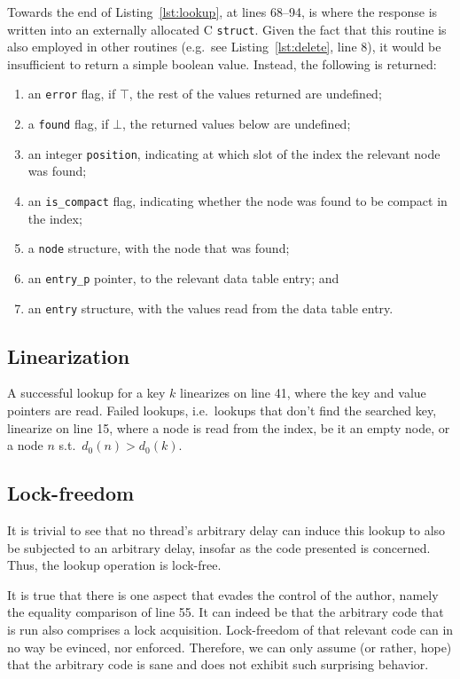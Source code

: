 Towards the end of Listing~\ref{lst:lookup}, at lines 68--94, is where the response is written into an externally allocated C \texttt{struct}.
Given the fact that this routine is also employed in other routines (e.g.\ see Listing~\ref{lst:delete}, line 8), it would be insufficient to return a simple boolean value.
Instead, the following is returned:
\begin{enumerate}
    \item an \texttt{error} flag, if $\top$, the rest of the values returned are undefined;
    \item a \texttt{found} flag, if $\bot$, the returned values below are undefined;
    \item an integer \texttt{position}, indicating at which slot of the index the relevant node was found;
    \item an \texttt{{is\_compact}} flag, indicating whether the node was found to be compact in the index;
    \item a \texttt{node} structure, with the node that was found;
    \item an \texttt{{entry\_p}} pointer, to the relevant data table entry; and
    \item an \texttt{entry} structure, with the values read from the data table entry.
\end{enumerate}

\subsection{Linearization}\label{subsec:lookup-linearization}

A successful lookup for a key $k$ linearizes on line 41, where the key and value pointers are read.
Failed lookups, i.e.\ lookups that don't find the searched key, linearize on line 15, where a node is read from the index, be it an empty node, or a node $n$ s.t.\ $d_0(n) > d_0(k)$.

\subsection{Lock-freedom}\label{subsec:lookup-lock-freedom}

It is trivial to see that no thread's arbitrary delay can induce this lookup to also be subjected to an arbitrary delay, insofar as the code presented is concerned.
Thus, the lookup operation is lock-free.

It is true that there is one aspect that evades the control of the author, namely the equality comparison of line 55.
It can indeed be that the arbitrary code that is run also comprises a lock acquisition.
Lock-freedom of that relevant code can in no way be evinced, nor enforced.
Therefore, we can only assume (or rather, hope) that the arbitrary code is sane and does not exhibit such surprising behavior.

